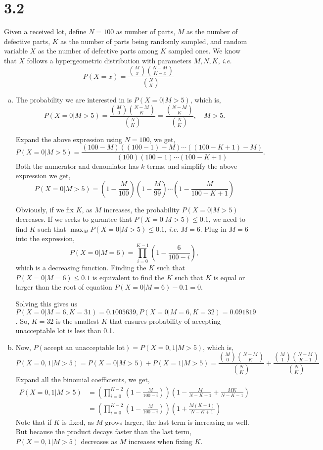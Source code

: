 \documentclass[letterpaper]{article}
\begin{document}
    \section*{3.2}
    Given a received lot, define $N=100$ as number of parts, $M$ as the number of defective parts, $K$ as the number of parts being randomly sampled, and random variable $X$ as the number of defective parts among $K$ sampled ones.
    We know that $X$ follows a hypergeometric distribution with parameters $M, N, K$, \emph{i.e.}
    \[
    P(X = x) = \frac{\binom{M}{x} \binom{N-M}{K-x}}{\binom{N}{K}}
    \]
    \begin{enumerate}[(a)]
    \item The probability we are interested in is $P(X=0|M>5)$, which is,
    \[
    P(X=0|M>5) = \frac{\binom{M}{0} \binom{N-M}{K}}{\binom{N}{K}} 
    = \frac{\binom{N-M}{K}}{\binom{N}{K}}, \quad M>5.
    \]

    Expand the above expression using $N=100$, we get,
    \[
    P(X=0|M>5) = \frac{(100-M)((100-1)-M)\cdots((100-K+1)-M)}{(100)(100-1)\cdots(100-K+1)}.
    \]
    Both the numerator and denomiator has $k$ terms, and simplify the above expression we get,
    \[
    P(X=0|M>5) = (1-\frac{M}{100})(1-\frac{M}{99})\cdots(1-\frac{M}{100-K+1})
    \]

    Obviously, if we fix $K$, as $M$ increases, the probability $P(X=0|M>5)$ decreases. If we seeks to gurantee that $P(X=0|M>5) \le 0.1$, we need to find $K$ such that $\max_{M} P(X=0|M>5) \le 0.1$, \emph{i.e.} $M=6$.
    Plug in $M=6$ into the expression, 
    \[
    P(X=0|M=6) = \prod_{i=0}^{K-1} \left(1-\frac{6}{100-i}\right),
    \]
    which is a decreasing function. Finding the $K$ such that $P(X=0|M=6) \le 0.1$ is equivalent to find the $K$ such that $K$ is equal or larger than the root of equation $P(X=0|M=6) - 0.1 = 0$.
    
    Solving this gives us $P(X=0|M=6,K=31)=0.1005639, P(X=0|M=6,K=32)=0.091819$. So, $K=32$ is the smallest $K$ that ensures probability of accepting unacceptable lot is less than 0.1.

    \item Now, $P(\text{accept an unacceptable lot}) = P(X=0,1|M>5)$, which is,
    \[
    P(X=0,1|M>5) = P(X=0|M>5) + P(X=1|M>5) 
    = \frac{\binom{M}{0}\binom{N-M}{K}}{\binom{N}{K}} + \frac{\binom{M}{1}\binom{N-M}{K-1}}{\binom{N}{K}}
    \]
    Expand all the binomial coefficients, we get,
    \begin{align*}
    P(X=0,1|M>5) & =  \left(\prod_{i=0}^{K-2} \left(1-\frac{M}{100-i}\right)\right) \left(1 - \frac{M}{N-K+1} + \frac{MK}{N-K-1}\right)\\
    & = \left(\prod_{i=0}^{K-2} \left(1-\frac{M}{100-i}\right)\right) \left(1+\frac{M(K-1)}{N-K+1}\right)
    \end{align*}
    Note that if $K$ is fixed, as $M$ grows larger, the last term is increasing as well. But because the product decays faster than the last term, $P(X=0,1|M>5)$ decreases as $M$ increases when fixing $K$.


\end{enumerate}
\end{document}
